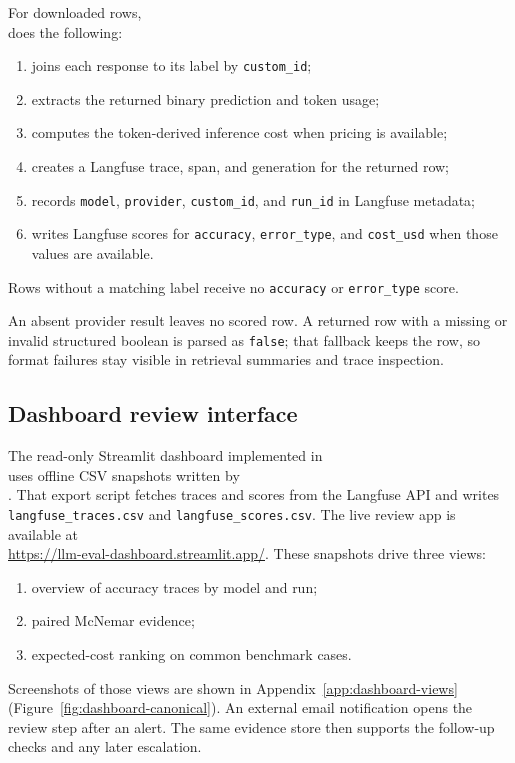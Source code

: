 For downloaded rows,\\
\mbox{}
does the following:
\begin{enumerate}
    \item joins each response to its label by \texttt{custom\_id};
    \item extracts the returned binary prediction and token usage;
    \item computes the token-derived inference cost when pricing is available;
    \item creates a Langfuse trace, span, and generation for the returned row;
    \item records \texttt{model}, \texttt{provider}, \texttt{custom\_id}, and \texttt{run\_id}
    in Langfuse metadata;
    \item writes Langfuse scores for \texttt{accuracy}, \texttt{error\_type}, and
    \texttt{cost\_usd} when those values are available.
\end{enumerate}
Rows without a matching label receive no \texttt{accuracy} or \texttt{error\_type} score.

An absent provider result leaves no scored row.
A returned row with a missing or invalid structured boolean is parsed as
\texttt{false}; that fallback keeps the row, so format failures stay visible
in retrieval summaries and trace inspection.

\subsection{Dashboard review interface}
The read-only Streamlit dashboard implemented in\\
\mbox{}
uses offline CSV snapshots written by\\
\mbox{}.
That export script fetches traces and scores from the Langfuse API and writes
\texttt{langfuse\_traces.csv} and \texttt{langfuse\_scores.csv}.
The live review app is available at\\
\url{https://llm-eval-dashboard.streamlit.app/}.
These snapshots drive three views:
\begin{enumerate}
    \item overview of accuracy traces by model and run;
    \item paired McNemar evidence;
    \item expected-cost ranking on common benchmark cases.
\end{enumerate}
Screenshots of those views are shown in Appendix~\ref{app:dashboard-views}
(Figure~\ref{fig:dashboard-canonical}).
An external email notification opens the review step after an alert.
The same evidence store then supports the follow-up checks and any later escalation.

